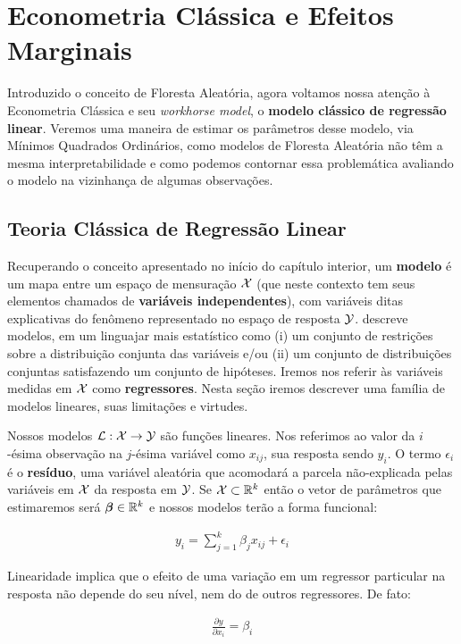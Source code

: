 
\chapter{Econometria Clássica e Efeitos Marginais}

Introduzido o conceito de Floresta Aleatória, agora voltamos nossa atenção à Econometria Clássica e seu \textit{workhorse model}, o \textbf{modelo clássico de regressão linear}. Veremos uma maneira de estimar os parâmetros desse modelo, via Mínimos Quadrados Ordinários, como modelos de Floresta Aleatória não têm a mesma interpretabilidade e como podemos contornar essa problemática avaliando o modelo na vizinhança de algumas observações. 



\section{Teoria Clássica de Regressão Linear}

Recuperando o conceito apresentado no início do capítulo interior, um \textbf{modelo} é um mapa entre um espaço de mensuração $\mathcal{X}$ (que neste contexto tem seus elementos chamados de \textbf{variáveis independentes}), com variáveis ditas explicativas do fenômeno representado no espaço de resposta $\mathcal{Y}$.  descreve modelos, em um linguajar mais estatístico como (i) um conjunto de restrições sobre a distribuição conjunta das variáveis e/ou (ii) um conjunto de distribuições conjuntas satisfazendo um conjunto de hipóteses. Iremos nos referir às variáveis medidas em $\mathcal{X}$ como \textbf{regressores}. Nesta seção iremos descrever uma família de modelos lineares, suas limitações e virtudes.



\begin{hipotese}[Linearidade]
Nossos modelos $\mathcal{L} : \mathcal{X} \to \mathcal{Y}$ são funções lineares. Nos referimos ao valor da $i$-ésima observação na $j$-ésima variável como $x_{ij}$, sua resposta sendo $y_i$. O termo $\epsilon_i$ é o \textbf{resíduo}, uma variável aleatória que acomodará a parcela não-explicada pelas variáveis em $\mathcal{X}$ da resposta em $\mathcal{Y}$. Se $\mathcal{X} \subset \mathbb{R}^k$ então o vetor de parâmetros que estimaremos será $\boldsymbol{\beta} \in \mathbb{R}^k$ e nossos modelos terão a forma funcional:

\begin{align}
    y_i = \sum_{j = 1}^k \beta_j x_{ij} + \epsilon_i \label{mod_lin}
\end{align}

Linearidade implica que o efeito de uma variação em um regressor particular na resposta não depende do seu nível, nem do de outros regressores. De fato:

\begin{align}
    \frac{\partial y}{\partial x_i} = \beta_i
\end{align}
\end{hipotese}


